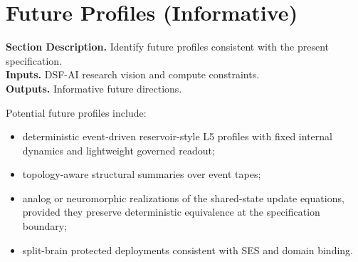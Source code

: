 \documentclass[11pt]{report}
\newcommand{\meta}[3]{\textbf{Section Description.} #1\\
\textbf{Inputs.} #2\\
\textbf{Outputs.} #3\par}
\begin{document}
\section{Future Profiles (Informative)}
\meta{Identify future profiles consistent with the present specification.}{DSF-AI research vision and compute constraints.}{Informative future directions.}

Potential future profiles include:
\begin{itemize}
    \item deterministic event-driven reservoir-style L5 profiles with fixed internal dynamics and lightweight governed readout;
    \item topology-aware structural summaries over event tapes;
    \item analog or neuromorphic realizations of the shared-state update equations, provided they preserve deterministic equivalence at the specification boundary;
    \item split-brain protected deployments consistent with SES and domain binding.
\end{itemize}
\end{document}
